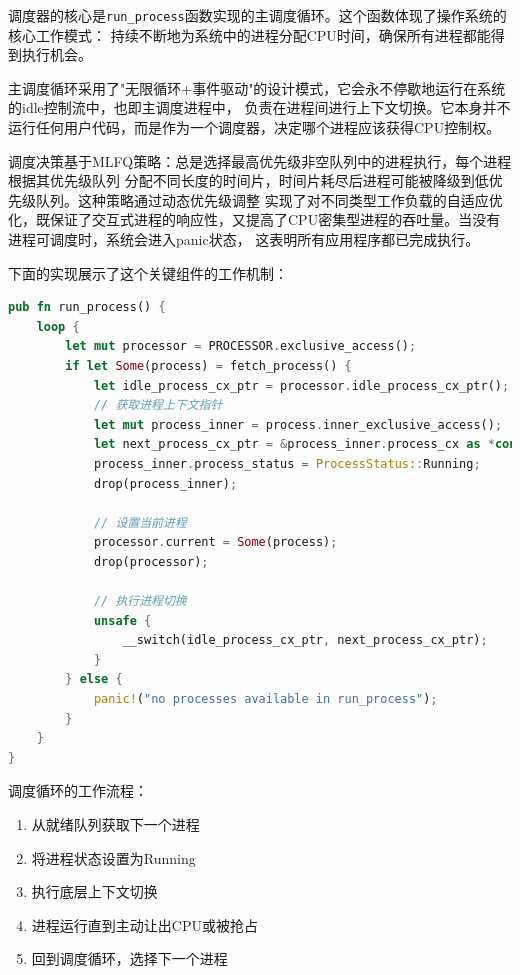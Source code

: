 调度器的核心是\lstinline[language=Rust]{run_process}函数实现的主调度循环。这个函数体现了操作系统的核心工作模式：
持续不断地为系统中的进程分配CPU时间，确保所有进程都能得到执行机会。

主调度循环采用了"无限循环+事件驱动"的设计模式，它会永不停歇地运行在系统的idle控制流中，也即主调度进程中，
负责在进程间进行上下文切换。它本身并不运行任何用户代码，而是作为一个调度器，决定哪个进程应该获得CPU控制权。

调度决策基于MLFQ策略：总是选择最高优先级非空队列中的进程执行，每个进程根据其优先级队列
分配不同长度的时间片，时间片耗尽后进程可能被降级到低优先级队列。这种策略通过动态优先级调整
实现了对不同类型工作负载的自适应优化，既保证了交互式进程的响应性，又提高了CPU密集型进程的吞吐量。当没有进程可调度时，系统会进入panic状态，
这表明所有应用程序都已完成执行。

下面的实现展示了这个关键组件的工作机制：

\begin{lstlisting}[language=Rust,caption={主调度循环}, label={lst:main-scheduler}]
pub fn run_process() {
    loop {
        let mut processor = PROCESSOR.exclusive_access();
        if let Some(process) = fetch_process() {
            let idle_process_cx_ptr = processor.idle_process_cx_ptr();
            // 获取进程上下文指针
            let mut process_inner = process.inner_exclusive_access();
            let next_process_cx_ptr = &process_inner.process_cx as *const ProcessContext;
            process_inner.process_status = ProcessStatus::Running;
            drop(process_inner);
            
            // 设置当前进程
            processor.current = Some(process);
            drop(processor);
            
            // 执行进程切换
            unsafe {
                __switch(idle_process_cx_ptr, next_process_cx_ptr);
            }
        } else {
            panic!("no processes available in run_process");
        }
    }
}
\end{lstlisting}

调度循环的工作流程：
\begin{enumerate}
    \item 从就绪队列获取下一个进程
    \item 将进程状态设置为Running
    \item 执行底层上下文切换
    \item 进程运行直到主动让出CPU或被抢占
    \item 回到调度循环，选择下一个进程
\end{enumerate}

